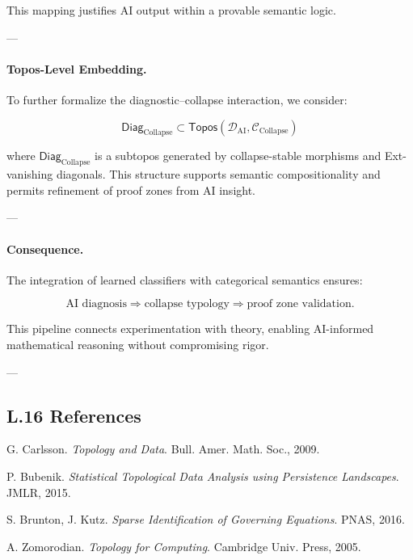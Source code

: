 \documentclass[11pt]{article}
\begin{document}
\begin{axiom}
\begin{axiom}
{{This mapping justifies AI output within a provable semantic logic.

---

\paragraph{Topos-Level Embedding.}

To further formalize the diagnostic–collapse interaction, we consider:

\[
\mathsf{Diag}_{\text{Collapse}} \subset \mathsf{Topos}(\mathcal{D}_{\text{AI}}, \mathcal{C}_{\text{Collapse}})
\]

where $\mathsf{Diag}_{\text{Collapse}}$ is a subtopos generated by collapse-stable morphisms  
and Ext-vanishing diagonals. This structure supports semantic compositionality  
and permits refinement of proof zones from AI insight.

---

\paragraph{Consequence.}

The integration of learned classifiers with categorical semantics ensures:

\[
\text{AI diagnosis} \Rightarrow \text{collapse typology} \Rightarrow \text{proof zone validation}.
\]

This pipeline connects experimentation with theory, enabling AI-informed mathematical reasoning  
without compromising rigor.

---

\subsection*{L.16 References}

\begin{thebibliography}{9}

G. Carlsson.  
\textit{Topology and Data}. Bull. Amer. Math. Soc., 2009.

P. Bubenik.  
\textit{Statistical Topological Data Analysis using Persistence Landscapes}. JMLR, 2015.

S. Brunton, J. Kutz.  
\textit{Sparse Identification of Governing Equations}. PNAS, 2016.

A. Zomorodian.  
\textit{Topology for Computing}. Cambridge Univ. Press, 2005.


\end{thebibliography}}}
\end{axiom}
\end{axiom}
\end{document}
